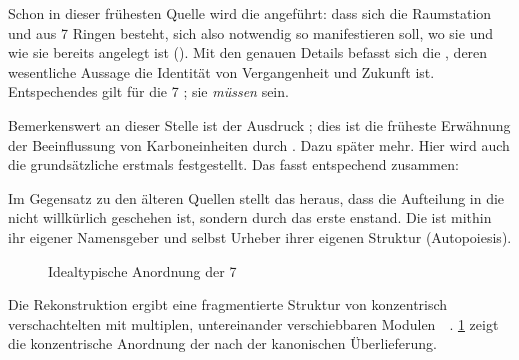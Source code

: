 Schon in dieser frühesten Quelle wird die  angeführt: dass sich die Raumstation  und aus 7 Ringen besteht, sich  also notwendig so manifestieren soll, wo sie und wie sie bereits angelegt ist (). Mit den genauen Details befasst sich die , deren wesentliche Aussage die Identität von Vergangenheit und Zukunft ist. Entspechendes gilt für die 7 ; sie \emph{müssen }sein.
    

Bemerkenswert an dieser Stelle ist der Ausdruck ; dies ist die früheste Erwähnung der Beeinflussung von Karboneinheiten durch . Dazu später mehr. Hier wird auch die grundsätzliche  erstmals festgestellt. Das   fasst entspechend zusammen:


Im Gegensatz zu den älteren Quellen stellt das  heraus, dass die Aufteilung in die  nicht willkürlich geschehen ist, sondern durch das erste  enstand. Die  ist mithin ihr eigener Namensgeber und selbst Urheber ihrer eigenen Struktur (Autopoiesis).

\begin{figure}[ht!]
    \centering
    
    \caption{Idealtypische Anordnung der 7 }
    \label{fig:ringconvention}
\end{figure}

Die Rekonstruktion ergibt eine fragmentierte Struktur von konzentrisch verschachtelten  mit multiplen, untereinander verschiebbaren Modulen~\cite{cbasebook}~\cite{cbasepressemap}. \cref{fig:ringconvention} zeigt die konzentrische Anordnung der  nach der kanonischen Überlieferung.
        
